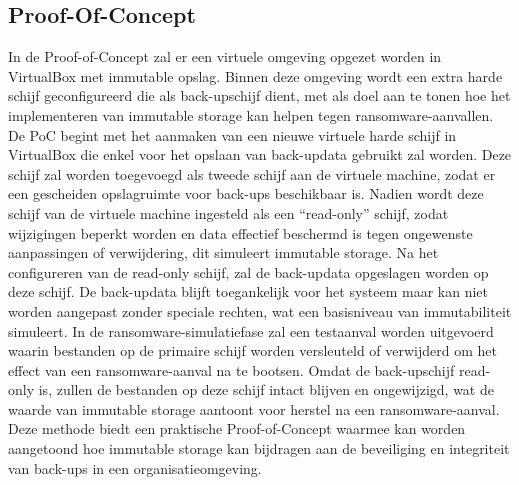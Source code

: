 \subsection{Proof-Of-Concept}
In de Proof-of-Concept zal er een virtuele omgeving opgezet worden in VirtualBox met immutable opslag. Binnen deze omgeving wordt een extra harde schijf geconfigureerd die als back-upschijf dient, met als doel aan te tonen hoe het implementeren van immutable storage kan helpen tegen ransomware-aanvallen. De PoC begint met het aanmaken van een nieuwe virtuele harde schijf in VirtualBox die enkel voor het opslaan van back-updata gebruikt zal worden. Deze schijf zal worden toegevoegd als tweede schijf aan de virtuele machine, zodat er een gescheiden opslagruimte voor back-ups beschikbaar is. Nadien wordt deze schijf van de virtuele machine ingesteld als een “read-only” schijf, zodat wijzigingen beperkt worden en data effectief beschermd is tegen ongewenste aanpassingen of verwijdering, dit simuleert immutable storage. Na het configureren van de read-only schijf, zal de back-updata opgeslagen worden op deze schijf. De back-updata blijft toegankelijk voor het systeem maar kan niet worden aangepast zonder speciale rechten, wat een basisniveau van immutabiliteit simuleert. In de ransomware-simulatiefase zal een testaanval worden uitgevoerd waarin bestanden op de primaire schijf worden versleuteld of verwijderd om het effect van een ransomware-aanval na te bootsen. Omdat de back-upschijf read-only is, zullen de bestanden op deze schijf intact blijven en ongewijzigd, wat de waarde van immutable storage aantoont voor herstel na een ransomware-aanval. Deze methode biedt een praktische Proof-of-Concept waarmee kan worden aangetoond hoe immutable storage kan bijdragen aan de beveiliging en integriteit van back-ups in een organisatieomgeving.